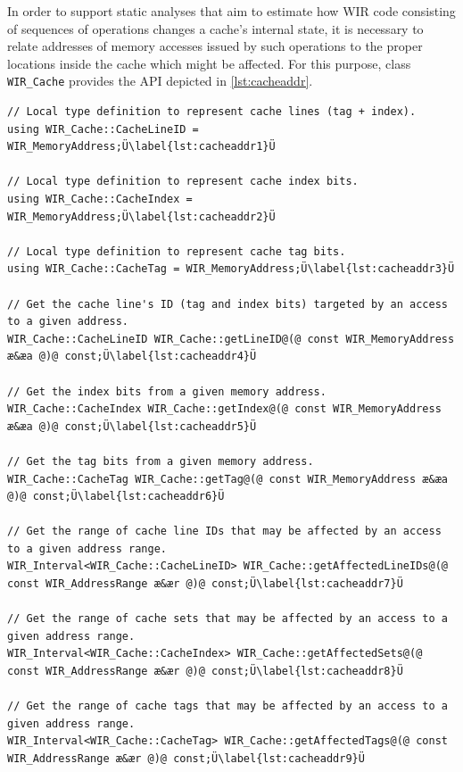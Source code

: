 In order to support static analyses that aim to estimate how \gls{WIR} code consisting of sequences of operations changes a cache's internal state, it is necessary to relate addresses of memory accesses issued by such operations to the proper locations inside the cache which might be affected.
For this purpose, class \texttt{WIR\_Cache} provides the \gls{API} depicted in \cref{lst:cacheaddr}.

\begin{lstlisting}[style=code,float=t,caption={Address and Address Range Handling of Class \texttt{WIR\_Cache}},label=lst:cacheaddr]
// Local type definition to represent cache lines (tag + index).
using WIR_Cache::CacheLineID = WIR_MemoryAddress;Ü\label{lst:cacheaddr1}Ü

// Local type definition to represent cache index bits.
using WIR_Cache::CacheIndex = WIR_MemoryAddress;Ü\label{lst:cacheaddr2}Ü

// Local type definition to represent cache tag bits.
using WIR_Cache::CacheTag = WIR_MemoryAddress;Ü\label{lst:cacheaddr3}Ü

// Get the cache line's ID (tag and index bits) targeted by an access to a given address.
WIR_Cache::CacheLineID WIR_Cache::getLineID@(@ const WIR_MemoryAddress æ&æa @)@ const;Ü\label{lst:cacheaddr4}Ü

// Get the index bits from a given memory address.
WIR_Cache::CacheIndex WIR_Cache::getIndex@(@ const WIR_MemoryAddress æ&æa @)@ const;Ü\label{lst:cacheaddr5}Ü

// Get the tag bits from a given memory address.
WIR_Cache::CacheTag WIR_Cache::getTag@(@ const WIR_MemoryAddress æ&æa @)@ const;Ü\label{lst:cacheaddr6}Ü

// Get the range of cache line IDs that may be affected by an access to a given address range.
WIR_Interval<WIR_Cache::CacheLineID> WIR_Cache::getAffectedLineIDs@(@ const WIR_AddressRange æ&ær @)@ const;Ü\label{lst:cacheaddr7}Ü

// Get the range of cache sets that may be affected by an access to a given address range.
WIR_Interval<WIR_Cache::CacheIndex> WIR_Cache::getAffectedSets@(@ const WIR_AddressRange æ&ær @)@ const;Ü\label{lst:cacheaddr8}Ü

// Get the range of cache tags that may be affected by an access to a given address range.
WIR_Interval<WIR_Cache::CacheTag> WIR_Cache::getAffectedTags@(@ const WIR_AddressRange æ&ær @)@ const;Ü\label{lst:cacheaddr9}Ü
\end{lstlisting}

